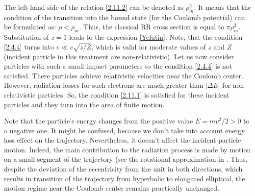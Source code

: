 \documentclass{SovJurn/JETPL}
\begin{document}
The left-hand side of the relation \eqref{2.11.2} can be denoted as $\rho_m^2$. It means that the condition of the transition into the bound state (for the Coulomb potential) can be formulated as: $\rho<\rho_m$. Thus, the classical RR cross section is equal to $\pi\rho_m^2$. Substitution of $z=1$ leads to the expression \eqref{Yelutin}. Note, that the condition \eqref{2.4.4} turns into  $v\ll c\sqrt{z/Z}$, which is valid for moderate values of $z$ and $Z$ (incident particle in this treatment are non-relativistic). Let us now consider particles with such a small impact parameters so the condition \eqref{2.4.4} is not satisfied. There particles achieve relativistic velocities near the Coulomb center. However, radiation losses for such electrons are much greater than $|\Delta E|$ for non-relativistic particles. So, the condition \eqref{2.11.1} is satisfied for these incident particles and they turn into the area of finite motion.
\par Note that the particle's energy changes from the positive value $E=mv^2/2>0$ to a negative one. It might be confused, because we don't take into account energy loss effect on the trajectory. Nevertheless, it doesn't affect the incident particle motion. Indeed, the main contribution to the radiation process is made by motion on a small segment of the trajectory (see the rotational approximation in \cite{kogan1992kramers}. Thus, despite the 
deviation of the eccentricity from the unit in both directions, which results in transition of the trajectory from hyperbolic to elongated elliptical, the motion regime near the Coulomb center remains practically unchanged.
 
\end{document}
